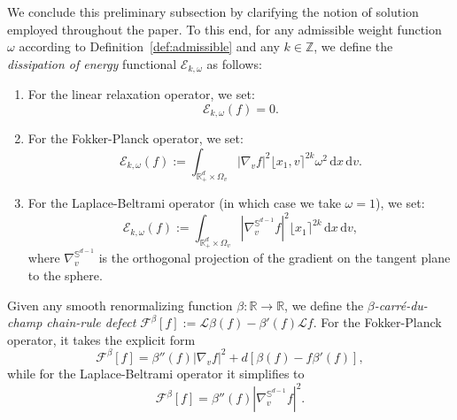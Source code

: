 \documentclass[11pt]{amsart}
\theoremstyle{definition}
\theoremstyle{remark}
\numberwithin{equation}{section}
\newcommand\R{{\mathbb R}}
\def\LL{{\mathcal L}}
\newcommand{\dd}{{\, \mathrm d}}
\newcommand{\wangle}[1]{\lfloor #1 \rceil}
\begin{document}
We conclude this preliminary subsection by clarifying the notion of solution employed throughout the paper. To this end, for any admissible weight function $\omega$ according to Definition~\ref{def:admissible} and any $k \in \mathbb{Z}$, we define the \emph{dissipation of energy} functional $\mathcal{E}_{k,\omega}$ as follows:
\begin{enumerate}
\item[(1)] For the linear relaxation operator, we set:
  \begin{equation*}
      \mathcal E_{k,\omega}(f)=0.
  \end{equation*}
  \item[(2)] For the Fokker-Planck operator, we set: 
    \begin{equation*}
      \mathcal E_{k,\omega}(f) :=  \int_{\R_+^d \times \Omega_v} \left| \nabla_v f \right|^2  \wangle{x_1,v}^{2k} \omega^2 \dd x \dd v.
    \end{equation*}
  \item[(3)] For the Laplace-Beltrami operator (in which case we take $\omega=1$), we set:
    \begin{equation*}
      \mathcal E_{k,\omega}(f) := \int_{\R_+^d \times \Omega_v} \left| \nabla_v ^{\mathbb S^{d-1}} f \right|^2  \wangle{x_1}^{2k} \dd x \dd v,
    \end{equation*}
    where $\nabla_v ^{\mathbb S^{d-1}}$ is the orthogonal projection of the gradient on the tangent plane to the sphere.
  \end{enumerate}
  Given any smooth renormalizing function $\beta : \mathbb{R} \to \mathbb{R}$, we define the \emph{$\beta$-carré-du-champ chain-rule defect} $\mathcal{F}^\beta[f]:=\LL \beta(f) - \beta'(f) \LL f$. For the Fokker-Planck operator, it takes the explicit form
  \begin{equation*}
    \mathcal{F}^\beta[f] = \beta''(f) \left|\nabla_v f\right|^2 + d \left[ \beta(f) - f \beta'(f) \right],
  \end{equation*}
  while for the Laplace-Beltrami operator it simplifies to
  \begin{equation*}
    \mathcal{F}^\beta[f] = \beta''(f) \left|\nabla_v^{\mathbb{S}^{d-1}} f\right|^2.
  \end{equation*}
  
\end{document}
